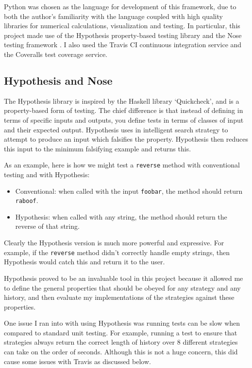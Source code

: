 \documentclass[a4paper,12pt]{article}
\begin{document}
Python was chosen as the language for development of this framework, due to both the author's familiarity with the language coupled with high quality libraries for numerical calculations, visualization and testing.
In particular, this project made use of the Hypothesis property-based testing library \cite{hypothesis} and the Nose testing framework \cite{nose}.
I also used the Travis CI continuous integration service and the Coveralls test coverage service.

\subsection{Hypothesis and Nose}
The Hypothesis library is inspired by the Haskell library `Quickcheck', and is a property-based form of testing.
The chief difference is that instead of defining in terms of specific inputs and outputs, you define tests in terms of classes of input and their expected output.
Hypothesis uses in intelligent search strategy to attempt to produce an input which falsifies the property.
Hypothesis then reduces this input to the minimum falsifying example and returns this.

As an example, here is how we might test a \texttt{reverse} method with conventional testing and with Hypothesis:

\begin{itemize}
    \item Conventional: when called with the input \texttt{foobar}, the method should return \texttt{raboof}.
    \item Hypothesis: when called with any string, the method should return the reverse of that string.
\end{itemize}

Clearly the Hypothesis version is much more powerful and expressive.
For example, if the \texttt{reverse} method didn't correctly handle empty strings, then Hypothesis would catch this and return it to the user.

Hypothesis proved to be an invaluable tool in this project because it allowed me to define the general properties that should be obeyed for any strategy and any history, and then evaluate my implementations of the strategies against these properties.

One issue I ran into with using Hypothesis was running tests can be slow when compared to standard unit testing.
For example, running a test to ensure that strategies always return the correct length of history over 8 different strategies can take on the order of seconds.
Although this is not a huge concern, this did cause some issues with Travis as discussed below.
\end{document}
